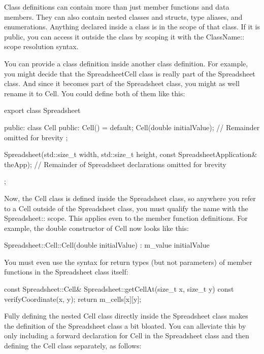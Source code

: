 Class definitions can contain more than just member functions and data members. They can also contain nested classes and structs, type aliases, and enumerations. Anything declared inside a class is in the scope of that class. If it is public, you can access it outside the class by scoping it with the ClassName:: scope resolution syntax.

You can provide a class definition inside another class definition. For example, you might decide that the SpreadsheetCell class is really part of the Spreadsheet class. And since it becomes part of the Spreadsheet class, you might as well rename it to Cell. You could define both of them like this:

\begin{cpp}
export class Spreadsheet
{
    public:
        class Cell
        {
            public:
                Cell() = default;
                Cell(double initialValue);
                // Remainder omitted for brevity
        };

        Spreadsheet(std::size_t width, std::size_t height,
            const SpreadsheetApplication& theApp);
        // Remainder of Spreadsheet declarations omitted for brevity
};
\end{cpp}

Now, the Cell class is defined inside the Spreadsheet class, so anywhere you refer to a Cell outside of the Spreadsheet class, you must qualify the name with the Spreadsheet:: scope. This applies even to the member function definitions. For example, the double constructor of Cell now looks like this:

\begin{cpp}
Spreadsheet::Cell::Cell(double initialValue)
    : m_value { initialValue }
{}
\end{cpp}

You must even use the syntax for return types (but not parameters) of member functions in the Spreadsheet class itself:

\begin{cpp}
const Spreadsheet::Cell& Spreadsheet::getCellAt(size_t x, size_t y) const
{
    verifyCoordinate(x, y);
    return m_cells[x][y];
}
\end{cpp}

Fully defining the nested Cell class directly inside the Spreadsheet class makes the definition of the Spreadsheet class a bit bloated. You can alleviate this by only including a forward declaration for Cell in the Spreadsheet class and then defining the Cell class separately, as follows:

